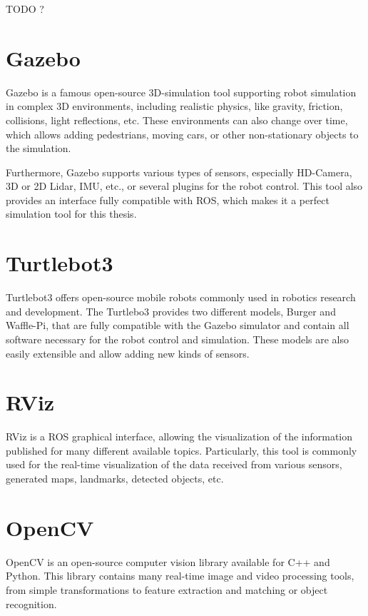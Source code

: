 TODO ?

\section{Gazebo}

Gazebo is a famous open-source 3D-simulation tool supporting robot simulation in complex 3D environments, including realistic physics, like gravity, friction, collisions, light reflections, etc. These environments can also change over time, which allows adding pedestrians, moving cars, or other non-stationary objects to the simulation.\par
Furthermore, Gazebo supports various types of sensors, especially HD-Camera, 3D or 2D Lidar, IMU, etc., or several plugins for the robot control. This tool also provides an interface fully compatible with ROS, which makes it a perfect simulation tool for this thesis.

\section{Turtlebot3}

Turtlebot3 offers open-source mobile robots commonly used in robotics research and development. The Turtlebo3 provides two different models, Burger and Waffle-Pi, that are fully compatible with the Gazebo simulator and contain all software necessary for the robot control and simulation. These models are also easily extensible and allow adding new kinds of sensors.

\section{RViz}

RViz is a ROS graphical interface, allowing the visualization of the information published for many different available topics. Particularly, this tool is commonly used for the real-time visualization of the data received from various sensors, generated maps, landmarks, detected objects, etc.

\section{OpenCV}

OpenCV is an open-source computer vision library available for C++ and Python. This library contains many real-time image and video processing tools, from simple transformations to feature extraction and matching or object recognition.

